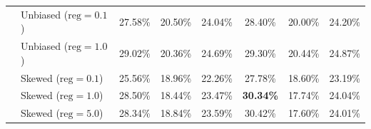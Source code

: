 \documentclass{article}
\theoremstyle{plain}
\theoremstyle{definition}
\theoremstyle{remark}
\begin{document}
\begin{table}[h]
\begin{center}
\begin{small}
{\begin{tabular}{llcccccc}
& Unbiased ($\text{reg}=0.1$) & 27.58\% & 20.50\% & 24.04\% & 28.40\% & 20.00\% & 24.20\% \\
& Unbiased ($\text{reg}=1.0$) & 29.02\% & 20.36\% & 24.69\% & 29.30\% & 20.44\% & 24.87\% \\
& Skewed ($\text{reg}=0.1$) & 25.56\% & 18.96\% & 22.26\% & 27.78\% & 18.60\% & 23.19\% \\
& Skewed ($\text{reg}=1.0$) & 28.50\% & 18.44\% & 23.47\% & \textbf{30.34\%} & 17.74\% & 24.04\% \\
& Skewed ($\text{reg}=5.0$) & 28.34\% & 18.84\% & 23.59\% & 30.42\% & 17.60\% & 24.01\% \\
\bottomrule
\end{tabular}%
}
\end{small}
\end{center}
\vskip -0.1in
\end{table}
\end{document}
